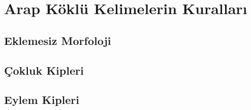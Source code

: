 
\chapter{Arap Köklü Kelimelerin Kuralları}
\section{Eklemesiz Morfoloji}

\section{Çokluk Kipleri}

\section{Eylem Kipleri}







